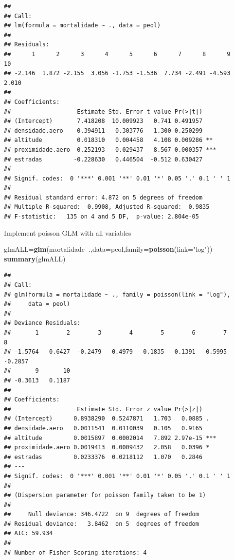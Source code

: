 \documentclass[
]{book}
\newenvironment{Shaded}{\begin{snugshade}}{\end{snugshade}}
\newcommand{\DataTypeTok}[1]{\textcolor[rgb]{0.13,0.29,0.53}{#1}}
\newcommand{\KeywordTok}[1]{\textcolor[rgb]{0.13,0.29,0.53}{\textbf{#1}}}
\newcommand{\NormalTok}[1]{#1}
\newcommand{\OperatorTok}[1]{\textcolor[rgb]{0.81,0.36,0.00}{\textbf{#1}}}
\newcommand{\StringTok}[1]{\textcolor[rgb]{0.31,0.60,0.02}{#1}}
\begin{document}
\begin{verbatim}
## 
## Call:
## lm(formula = mortalidade ~ ., data = peol)
## 
## Residuals:
##      1      2      3      4      5      6      7      8      9     10 
## -2.146  1.872 -2.155  3.056 -1.753 -1.536  7.734 -2.491 -4.593  2.010 
## 
## Coefficients:
##                   Estimate Std. Error t value Pr(>|t|)    
## (Intercept)       7.418208  10.009923   0.741 0.491957    
## densidade.aero   -0.394911   0.303776  -1.300 0.250299    
## altitude          0.018310   0.004458   4.108 0.009286 ** 
## proximidade.aero  0.252193   0.029437   8.567 0.000357 ***
## estradas         -0.228630   0.446504  -0.512 0.630427    
## ---
## Signif. codes:  0 '***' 0.001 '**' 0.01 '*' 0.05 '.' 0.1 ' ' 1
## 
## Residual standard error: 4.872 on 5 degrees of freedom
## Multiple R-squared:  0.9908,	Adjusted R-squared:  0.9835 
## F-statistic:   135 on 4 and 5 DF,  p-value: 2.804e-05
\end{verbatim}

Implement poisson GLM with all variables

\begin{Shaded}
\begin{Highlighting}[]
\NormalTok{glmALL=}\KeywordTok{glm}\NormalTok{(mortalidade}\OperatorTok{~}\NormalTok{.,}\DataTypeTok{data=}\NormalTok{peol,}\DataTypeTok{family=}\KeywordTok{poisson}\NormalTok{(}\DataTypeTok{link=}\StringTok{"log"}\NormalTok{))}
\KeywordTok{summary}\NormalTok{(glmALL)}
\end{Highlighting}
\end{Shaded}

\begin{verbatim}
## 
## Call:
## glm(formula = mortalidade ~ ., family = poisson(link = "log"), 
##     data = peol)
## 
## Deviance Residuals: 
##       1        2        3        4        5        6        7        8  
## -1.5764   0.6427  -0.2479   0.4979   0.1835   0.1391   0.5995  -0.2857  
##       9       10  
## -0.3613   0.1187  
## 
## Coefficients:
##                   Estimate Std. Error z value Pr(>|z|)    
## (Intercept)      0.8938290  0.5247871   1.703   0.0885 .  
## densidade.aero   0.0011541  0.0110039   0.105   0.9165    
## altitude         0.0015897  0.0002014   7.892 2.97e-15 ***
## proximidade.aero 0.0019413  0.0009432   2.058   0.0396 *  
## estradas         0.0233376  0.0218112   1.070   0.2846    
## ---
## Signif. codes:  0 '***' 0.001 '**' 0.01 '*' 0.05 '.' 0.1 ' ' 1
## 
## (Dispersion parameter for poisson family taken to be 1)
## 
##     Null deviance: 346.4722  on 9  degrees of freedom
## Residual deviance:   3.8462  on 5  degrees of freedom
## AIC: 59.934
## 
## Number of Fisher Scoring iterations: 4
\end{verbatim}
\end{document}
